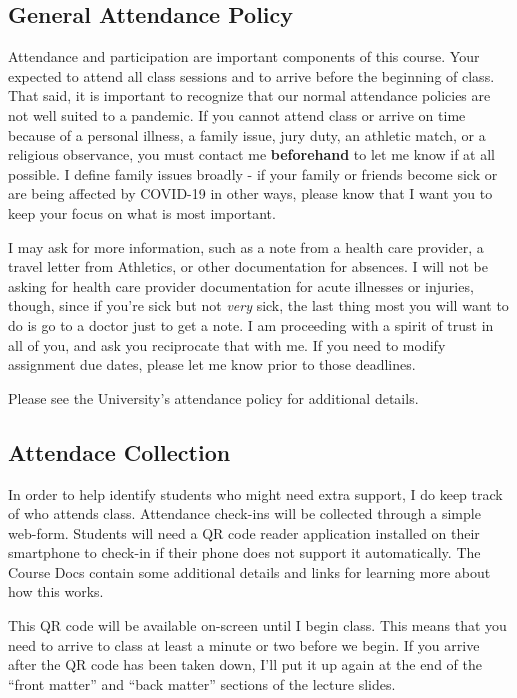 \documentclass[
]{book}
\begin{document}
\hypertarget{general-attendance-policy}{%
\subsection{General Attendance Policy}\label{general-attendance-policy}}

Attendance and participation are important components of this course. Your expected to attend all class sessions and to arrive before the beginning of class. That said, it is important to recognize that our normal attendance policies are not well suited to a pandemic. If you cannot attend class or arrive on time because of a personal illness, a family issue, jury duty, an athletic match, or a religious observance, you must contact me \textbf{beforehand} to let me know if at all possible. I define family issues broadly - if your family or friends become sick or are being affected by COVID-19 in other ways, please know that I want you to keep your focus on what is most important.

I may ask for more information, such as a note from a health care provider, a travel letter from Athletics, or other documentation for absences. I will not be asking for health care provider documentation for acute illnesses or injuries, though, since if you're sick but not \emph{very} sick, the last thing most you will want to do is go to a doctor just to get a note. I am proceeding with a spirit of trust in all of you, and ask you reciprocate that with me. If you need to modify assignment due dates, please let me know prior to those deadlines.

Please see the University's attendance policy for additional details.

\hypertarget{attendace-collection}{%
\subsection{Attendace Collection}\label{attendace-collection}}

In order to help identify students who might need extra support, I do keep track of who attends class. Attendance check-ins will be collected through a simple web-form. Students will need a QR code reader application installed on their smartphone to check-in if their phone does not support it automatically. The Course Docs contain some additional details and links for learning more about how this works.

This QR code will be available on-screen until I begin class. This means that you need to arrive to class at least a minute or two before we begin. If you arrive after the QR code has been taken down, I'll put it up again at the end of the ``front matter'' and ``back matter'' sections of the lecture slides.
\end{document}

